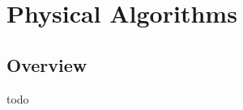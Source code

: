 


\chapter{Physical Algorithms}
\label{ch:physical}

\section{Overview}
todo


\newpage
\newpage
\newpage
\newpage
\newpage



